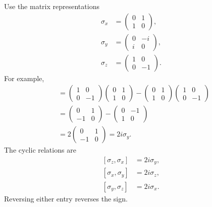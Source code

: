 Use the matrix representations
\begin{equation}
\begin{aligned}
\sigma_x&=
\begin{pmatrix}0&1\\1&0\end{pmatrix},\\[0.4em]
\sigma_y&=
\begin{pmatrix}0&-i\\i&0\end{pmatrix},\\[0.4em]
\sigma_z&=
\begin{pmatrix}1&0\\0&-1\end{pmatrix}.
\end{aligned}
\end{equation}
For example,
\begin{align}
[\sigma_z,\sigma_x]
&=
\begin{pmatrix}1&0\\0&-1\end{pmatrix}
\begin{pmatrix}0&1\\1&0\end{pmatrix}
-
\begin{pmatrix}0&1\\1&0\end{pmatrix}
\begin{pmatrix}1&0\\0&-1\end{pmatrix}\\
&=
\begin{pmatrix}0&1\\-1&0\end{pmatrix}
-
\begin{pmatrix}0&-1\\1&0\end{pmatrix}\\
&=2
\begin{pmatrix}0&1\\-1&0\end{pmatrix}
=2i\sigma_y.
\end{align}
The cyclic relations are
\begin{equation}
\begin{aligned}
[\sigma_z,\sigma_x]&=2i\sigma_y,\\
[\sigma_x,\sigma_y]&=2i\sigma_z,\\
[\sigma_y,\sigma_z]&=2i\sigma_x.
\end{aligned}
\label{eq:l5-pauli-commutators}
\end{equation}
Reversing either entry reverses the sign.

